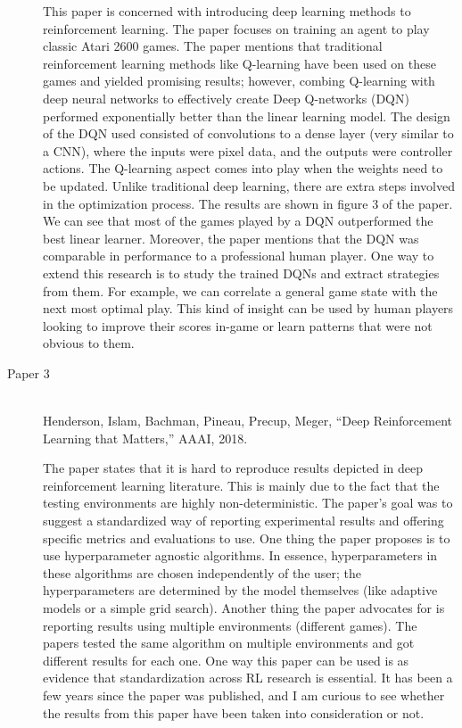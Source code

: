 \documentclass[12pt]{article}
\begin{document}
\begin{description}
    This paper is concerned with introducing deep learning methods to
    reinforcement learning. The paper focuses on training an agent to play
    classic Atari 2600 games. The paper mentions that traditional reinforcement
    learning methods like Q-learning have been used on these games and yielded
    promising results; however, combing Q-learning with deep neural networks to
    effectively create Deep Q-networks (DQN) performed exponentially better
    than the linear learning model. The design of the DQN used consisted of
    convolutions to a dense layer (very similar to a CNN), where the inputs
    were pixel data, and the outputs were controller actions. The Q-learning
    aspect comes into play when the weights need to be updated. Unlike
    traditional deep learning, there are extra steps involved in the
    optimization process. The results are shown in figure 3 of the paper. We
    can see that most of the games played by a DQN outperformed the best linear
    learner. Moreover, the paper mentions that the DQN was comparable in
    performance to a professional human player. One way to extend this research
    is to study the trained DQNs and extract strategies from them. For example,
    we can correlate a general game state with the next most optimal play. This
    kind of insight can be used by human players looking to improve their
    scores in-game or learn patterns that were not obvious to them.


    \item[Paper 3] \hfill \\
    Henderson, Islam, Bachman, Pineau, Precup, Meger, “Deep Reinforcement
    Learning that Matters,” AAAI, 2018.

    The paper states that it is hard to reproduce results depicted in deep
    reinforcement learning literature. This is mainly due to the fact that the
    testing environments are highly non-deterministic. The paper's goal was to
    suggest a standardized way of reporting experimental results and offering
    specific metrics and evaluations to use. One thing the paper proposes is to
    use hyperparameter agnostic algorithms. In essence, hyperparameters in
    these algorithms are chosen independently of the user; the hyperparameters
    are determined by the model themselves (like adaptive models or a simple
    grid search). Another thing the paper advocates for is reporting results
    using multiple environments (different games). The papers tested the same
    algorithm on multiple environments and got different results for each one.
    One way this paper can be used is as evidence that standardization across
    RL research is essential. It has been a few years since the paper was
    published, and I am curious to see whether the results from this paper have
    been taken into consideration or not.
    

\end{description}
\end{document}
